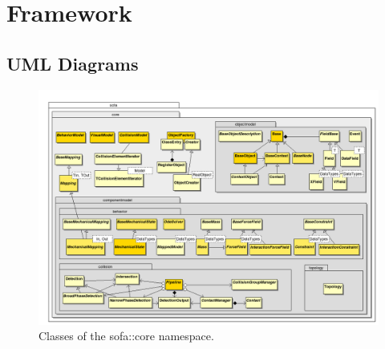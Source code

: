 
\section{Framework}

\subsection{UML Diagrams}

\begin{figure}
\centering
\includegraphics[width=\linewidth]{uml-sofa-core.png}
\caption{Classes of the sofa::core namespace.}
\label{fig:uml-sofa-core}
\end{figure}
